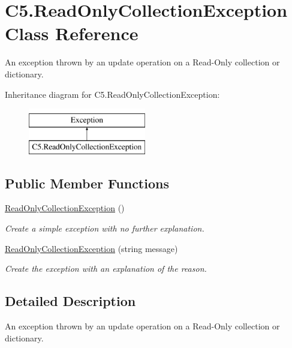 \hypertarget{class_c5_1_1_read_only_collection_exception}{}\section{C5.\+Read\+Only\+Collection\+Exception Class Reference}
\label{class_c5_1_1_read_only_collection_exception}


An exception thrown by an update operation on a Read-\/\+Only collection or dictionary.  


Inheritance diagram for C5.\+Read\+Only\+Collection\+Exception\+:\begin{figure}[H]
\begin{center}
\leavevmode
\includegraphics[height=2.000000cm]{class_c5_1_1_read_only_collection_exception}
\end{center}
\end{figure}
\subsection*{Public Member Functions}
\begin{DoxyCompactItemize}
\item 
\hyperlink{class_c5_1_1_read_only_collection_exception_a552d3e4ff9ebe2f8e29406c8329de905}{Read\+Only\+Collection\+Exception} ()
\begin{DoxyCompactList}\small\item\em Create a simple exception with no further explanation. \end{DoxyCompactList}\item 
\hyperlink{class_c5_1_1_read_only_collection_exception_ad7f14682f6cf464b22071a563d8f27d5}{Read\+Only\+Collection\+Exception} (string message)
\begin{DoxyCompactList}\small\item\em Create the exception with an explanation of the reason. \end{DoxyCompactList}\end{DoxyCompactItemize}


\subsection{Detailed Description}
An exception thrown by an update operation on a Read-\/\+Only collection or dictionary. 

